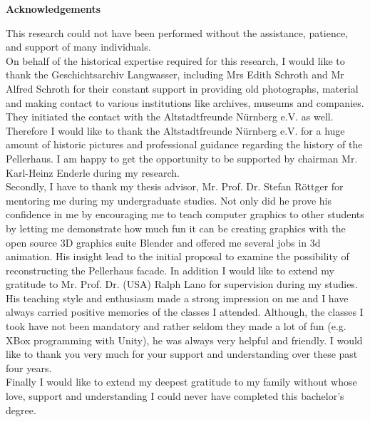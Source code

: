 \thispagestyle{plain}
\begin{center}
	
	\LARGE
	\textbf{Acknowledgements}
	
\end{center}
\vspace{100pt}

This research could not have been performed without the assistance, patience, and support of many individuals.\\

On behalf of the historical expertise required for this research, I would like to thank the Geschichtsarchiv Langwasser, including Mrs Edith Schroth and Mr Alfred Schroth for their constant support in providing old photographs, material and making contact to various institutions like archives, museums and companies. They initiated the contact with the Altstadtfreunde Nürnberg e.V. as well.\\
Therefore I would like to thank the Altstadtfreunde Nürnberg e.V. for a huge amount of historic pictures and professional guidance regarding the history of the Pellerhaus. I am happy to get the opportunity to be supported by chairman Mr. Karl-Heinz Enderle during my research.\\

Secondly, I have to thank my thesis advisor, Mr. Prof. Dr. Stefan Röttger for mentoring me during my undergraduate studies. Not only did he prove his confidence in me by encouraging me to teach computer graphics to other students by letting me demonstrate how much fun it can be creating graphics with the open source 3D graphics suite Blender and offered me several jobs in 3d animation. His insight lead to the initial proposal to examine the possibility of reconstructing the Pellerhaus facade. In addition I would like to extend my gratitude to Mr. Prof. Dr. (USA) Ralph Lano for supervision during my studies. His teaching style and enthusiasm made a strong impression on me and I have always carried positive memories of the classes I attended. Although, the classes I took have not been mandatory and rather seldom they made a lot of fun (e.g. XBox programming with Unity), he was always very helpful and friendly. I would like to thank you very much for your support and understanding over these past four years.\\

Finally I would like to extend my deepest gratitude to my family without whose love, support and understanding I could never have completed this bachelor's degree.
